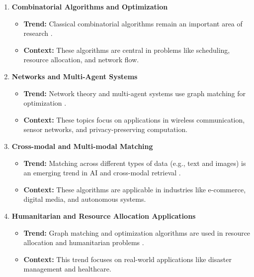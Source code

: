 \begin{enumerate}
            \item \textbf{Combinatorial Algorithms and Optimization}
            \begin{itemize}
                \item \textbf{Trend:} Classical combinatorial algorithms remain an important area of research \cite{faster_bipartite_matching}.
                \item \textbf{Context:} These algorithms are central in problems like scheduling, resource allocation, and network flow.
            \end{itemize}
        
            \item \textbf{Networks and Multi-Agent Systems}
            \begin{itemize}
                \item \textbf{Trend:} Network theory and multi-agent systems use graph matching for optimization \cite{network_matching, privacy_graph_matching}.
                \item \textbf{Context:} These topics focus on applications in wireless communication, sensor networks, and privacy-preserving computation.
            \end{itemize}
        
            \item \textbf{Cross-modal and Multi-modal Matching}
            \begin{itemize}
                \item \textbf{Trend:} Matching across different types of data (e.g., text and images) is an emerging trend in AI and cross-modal retrieval \cite{cross_modal_matching}.
                \item \textbf{Context:} These algorithms are applicable in industries like e-commerce, digital media, and autonomous systems.
            \end{itemize}
        
            \item \textbf{Humanitarian and Resource Allocation Applications}
            \begin{itemize}
                \item \textbf{Trend:} Graph matching and optimization algorithms are used in resource allocation and humanitarian problems \cite{humanitarian_routing}.
                \item \textbf{Context:} This trend focuses on real-world applications like disaster management and healthcare.
            \end{itemize}
        

\end{enumerate}

